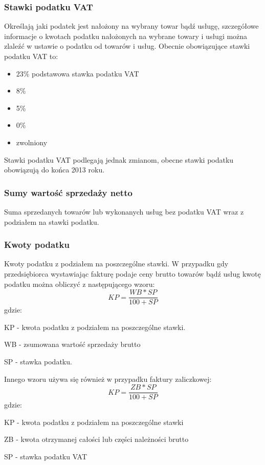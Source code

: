 \subsubsection{Stawki podatku VAT}
Określają jaki podatek jest nałożony na wybrany towar bądź usługę, szczegółowe
informacje o kwotach podatku nałożonych na wybrane towary i usługi można
zlaleźć w ustawie o podatku od towarów i usług\cite{etykieta1}. Obecnie
obowiązujące stawki podatku VAT to:
\begin{itemize}
  \item 23\% podstawowa stawka podatku VAT
  \item 8\%
  \item 5\%
  \item 0\%
  \item zwolniony
\end{itemize}
Stawki podatku VAT podlegają jednak zmianom, obecne stawki podatku obowiązują do
końca 2013 roku.
\subsubsection{Sumy wartość sprzedaży netto}
Suma sprzedanych towarów lub wykonanych usług bez podatku VAT wraz z podziałem
na stawki podatku.
\subsubsection{Kwoty podatku}
Kwoty podatku z podziałem na poszczególne stawki. W przypadku gdy przedsiębiorca
wystawiając fakturę podaje ceny brutto towarów bądź usług kwotę podatku można
obliczyć z następującego wzoru:
\begin{equation}
KP = \frac{WB * SP}{100 + SP}
\end{equation}
gdzie:

KP - kwota podatku z podziałem na poszczególne stawki.

WB - zsumowana wartość sprzedaży brutto

SP - stawka podatku.\newline


Innego wzoru używa się również w przypadku faktury zaliczkowej:
\begin{equation}
KP = \frac{ZB*SP}{100+SP}
\end{equation}
gdzie:

KP - kwota podatku z podziałem na poszczególne stawki

ZB - kwota otrzymanej całości lub części należności brutto

SP - stawka podatku VAT

